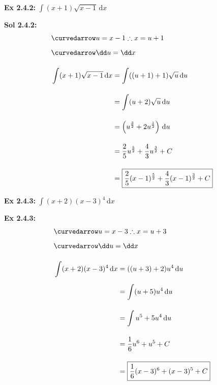 \begin{tcolorbox}[example]
    \textbf{Ex 2.4.2: } $\int (x + 1)\sqrt{x - 1} \,\mathrm{d}x$
\end{tcolorbox} 
\begin{tcolorbox}[solution]
    \textbf{Sol 2.4.2: } \begin{align*}
        & \curvedarrow u = x - 1 \therefore x = u + 1 \\[5.5pt]
        & \curvedarrow \dd u = \dd x \\[11pt]
        & \int (x + 1)\sqrt{x - 1} \,\mathrm{d}x \begin{aligned}[t]
            & = \int ((u + 1) + 1)\sqrt{u} \,\mathrm{d}u \\[11pt]
            & = \int (u + 2)\sqrt{u} \,\mathrm{d}u \\[11pt]
            & = \left(u^{\frac{3}{2}} + 2u^{\frac{1}{2}}\right) \,\mathrm{d}u \\[11pt]
            & = \dfrac{2}{5}u^{\frac{5}{2}} + \dfrac{4}{3}u^{\frac{3}{2}} + C \\[11pt]
            & = \boxed{\frac{2}{5}(x - 1)^{\frac{5}{2}} + \dfrac{4}{3}(x - 1)^{\frac{3}{2}} + C}
        \end{aligned}
    \end{align*}
\end{tcolorbox} \vspace{11pt}

\begin{tcolorbox}[example]
    \textbf{Ex 2.4.3: } $\int (x + 2)(x - 3)^4 \,\mathrm{d}x$ 
\end{tcolorbox}
\begin{tcolorbox}[solution]
    \textbf{Ex 2.4.3: } \begin{align*}
        & \curvedarrow u = x - 3 \therefore x = u + 3 \\[5.5pt]
        & \curvedarrow \dd u = \dd x \\[11pt]
        & \int (x + 2)(x - 3)^4 \,\mathrm{d}x \begin{aligned}[t]
            & = ((u + 3) + 2)u^4 \,\mathrm{d}u \\[11pt]
            & = \int (u + 5)u^4 \,\mathrm{d}u \\[11pt]
            & = \int u^5 + 5u^4 \,\mathrm{d}u \\[11pt]
            & = \dfrac{1}{6}u^6 + u^5 + C \\[11pt]
            & = \boxed{\dfrac{1}{6}(x - 3)^6 + (x - 3)^5 + C}
        \end{aligned}
    \end{align*}
\end{tcolorbox} \vspace{11pt}

